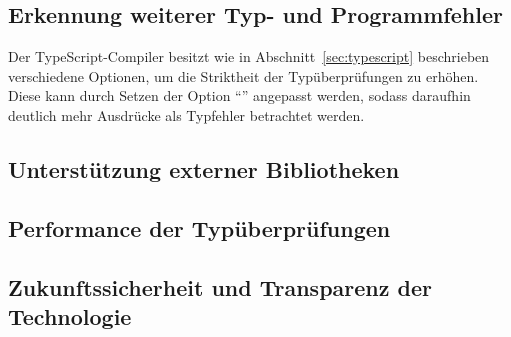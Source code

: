 \subsection{Erkennung weiterer Typ- und Programmfehler}
\label{goal:new-type-errors}

Der TypeScript-Compiler besitzt wie in Abschnitt~\ref{sec:typescript} beschrieben verschiedene Optionen, um die Striktheit der Typüberprüfungen zu erhöhen. Diese kann durch Setzen der Option \enquote{} angepasst werden, sodass daraufhin deutlich mehr Ausdrücke als Typfehler betrachtet werden.


\subsection{Unterstützung externer Bibliotheken}


\subsection{Performance der Typüberprüfungen}


\subsection{Zukunftssicherheit und Transparenz der Technologie}

